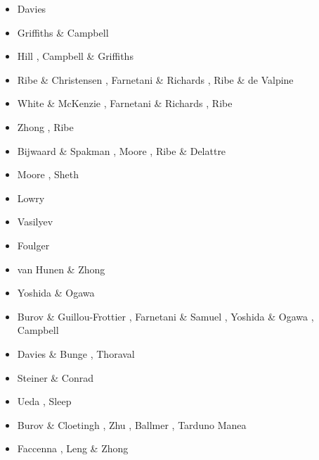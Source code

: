 \begin{scriptsize}
\begin{itemize}
\item[\nineteenninety] Davies \cite{davi90}
\item[\nineteenninetyone] Griffiths \& Campbell \cite{grca91}
\item[\nineteenninetytwo] Hill \etal \cite{hicd92}, Campbell \& Griffiths \cite{cagr92}
\item[\nineteenninetyfour] Ribe \& Christensen \cite{rich94}, Farnetani \& Richards \cite{fari94},
                           Ribe \& de Valpine \cite{ride94}
\item[\nineteenninetyfive] White \& McKenzie \cite{whmc95}, Farnetani \& Richards \cite{fari95},
                           Ribe \etal \cite{rict95}
\item[\nineteenninetysix] Zhong \etal \cite{zhgm96}, Ribe \cite{ribe96}
\item[\nineteenninetyeight] Bijwaard \& Spakman \cite{bisp98}, Moore \etal \cite{most98},
                            Ribe \& Delattre \cite{ride98}
\item[\nineteenninetynine] Moore \etal \cite{most99}, Sheth \cite{shet99}
\item[\twothousand] Lowry \etal \cite{lors00}
\item[\twothousandone] Vasilyev \etal \cite{vapy01}
\item[\twothousandtwo] Foulger \cite{foul02}
\item[\twothousandthree] van Hunen \& Zhong \cite{vazh03}
\item[\twothousandfour] Yoshida \& Ogawa \cite{yoog04}
\item[\twothousandfive] Burov \& Guillou-Frottier \cite{bugu05}, Farnetani \& Samuel \cite{fasa05}, 
                        Yoshida \& Ogawa \cite{yoog05}, Campbell \cite{camp05}
\item[\twothousandsix] Davies \& Bunge \cite{dabu06}, Thoraval \etal \cite{thtd06}
\item[\twothousandseven] Steiner \& Conrad \cite{stco07}
\item[\twothousandeight] Ueda \etal \cite{uegs08}, Sleep \cite{slee08}
\item[\twothousandnine] Burov \& Cloetingh \cite{bucl09}, Zhu \etal \cite{zhgy09},
                        Ballmer \etal \cite{baiv10}, Tarduno \etal \cite{tabs09}
                        Manea \etal \cite{maml09}
\item[\twothousandten] Faccenna \etal \cite{fabl10}, Leng \& Zhong \cite{lezh10}

\end{itemize}
\end{scriptsize}
